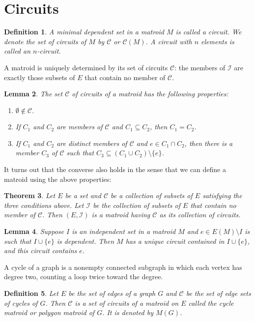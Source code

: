 \documentclass[11pt,letterpaper]{article}
\newcommand{\I}{\mathcal{I}}
\newcommand{\C}{\mathcal{C}}
\theoremstyle{appendix-result}
\newtheorem{theorem}{Theorem}[section]
\newtheorem{lemma}[theorem]{Lemma}
\theoremstyle{appendix-definition}
\newtheorem{definition}[theorem]{Definition}
\begin{document}
\section{Circuits}
\begin{definition}
    A minimal dependent set in a matroid $M$ is called a circuit. We denote the set of circuits of $M$ by $\C$ or $\C(M)$. A circuit with $n$ elements is called an $n$-circuit.
\end{definition}
A matroid is uniquely determined by its set of circuits $\C$: the members of $\I$ are exactly those subsets of $E$ that contain no member of $\C$.
\begin{lemma}
    The set $\C$ of circuits of a matroid has the following properties:
    \begin{enumerate}
        \item $\emptyset \notin \C$.
        \item If $C_1$ and $C_2$ are members of $\C$ and $C_1 \subseteq C_2$, then $C_1=C_2$.
        \item If $C_1$ and $C_2$ are distinct members of $\C$ and $e \in C_1 \cap C_2$, then there is a member $C_3$ of $\C$ such that $C_3 \subseteq (C_1 \cup C_2)\setminus\{e\}$.
    \end{enumerate}
\end{lemma}
It turns out that the converse also holds in the sense that we can define a matroid using the above properties:
\begin{theorem}
    Let $E$ be a set and $\C$ be a collection of subsets of $E$ satisfying the three conditions above. Let $\I$ be the collection of subsets of $E$ that contain no member of $\C$. Then $(E, \I)$ is a matroid having $\C$ as its collection of circuits.
\end{theorem}
\begin{lemma}
    Suppose $I$ is an independent set in a matroid $M$ and $e\in E(M)\setminus I$ is such that $I \cup \{e\}$ is dependent. Then $M$ has a unique circuit contained in $I \cup \{e\}$, and this circuit contains $e$.
\end{lemma}
A cycle of a graph is a nonempty connected subgraph in which each vertex has degree two, counting a loop twice toward the degree.
\begin{definition}
    Let $E$ be the set of edges of a graph $G$ and $\C$ be the set of edge sets of cycles of $G$. Then $\C$ is a set of circuits of a matroid on $E$ called the cycle matroid or polygon matroid of $G$. It is denoted by $M(G)$.
\end{definition}
\end{document}
